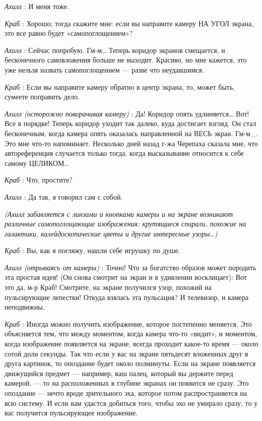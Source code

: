\documentclass[../main.tex]{subfiles}
\begin{document}
\begin{dialogue}
\emph{Ахилл} : И меня тоже.

\emph{Краб} : Хорошо; тогда скажите мне: если вы направите камеру НА УГОЛ экрана, это все равно будет «самопоглощением»?

\emph{Ахилл} : Сейчас попробую. Гм-м\ldots{} Теперь коридор экранов смещается, и бесконечного самовложения больше не выходит. Красиво, но мне кажется, это уже нельзя назвать самопоглощением --- разве что неудавшимся.

\emph{Краб} : Если вы направите камеру обратно в центр экрана, то, может быть, сумеете поправить дело.

\emph{Ахилл (осторожно поворачивая камеру)} : Да! Коридор опять удлиняется\ldots{} Вот! Все в порядке! Теперь коридор уходит так далеко, куда достигает взгляд. Он стал бесконечным, когда камера опять оказалась направленной на ВЕСЬ экран. Гм-м\_. Это мне что-то напоминает. Несколько дней назад г-жа Черепаха сказала мне, что автореференция случается только тогда, когда высказывание относится к себе самому ЦЕЛИКОМ\ldots{}

\emph{Краб} : Что, простите?

\emph{Ахилл} : Да так, я говорил сам с собой.

\emph{(Ахилл забавляется с линзами и кнопками камеры и на экране возникают различные самопоглощающие изображения: крутящиеся спирали, похожие на галактики, калейдоскопические цветы и другие интересные узоры\ldots)}

\emph{Краб} : Вы, как я погляжу, нашли себе игрушку по душе.

\emph{Ахилл (отрываясь от камеры)} : Точно! Что за богатство образов может породить эта простая идея! (Он снова смотрит на экран и в удивлении восклицает): Вот это да, м-р Краб! Смотрите, на экране получился узор, похожий на пульсирующие лепестки! Откуда взялась эта пульсация? И телевизор, и камера неподвижны.

\emph{Краб} : Иногда можно получить изображение, которое постепенно меняется. Это объясняется тем, что между моментом, когда камера что-то «видит», и моментом, когда изображение появляется на экране, всегда проходит какое-то время --- около сотой доли секунды. Так что если у вас на экране пятьдесят вложенных друг в друга картинок, то опоздание будет около полминуты. Если на экране появляется движущийся предмет --- например, ваш палец, который вы держите перед камерой, --- то на расположенных в глубине экранах он появится не сразу. Это опоздание --- нечто вроде зрительного эха, которое потом распространяется на всю систему. И если вам удастся добиться того, чтобы эхо не умирало сразу, то у вас получится пульсирующее изображение.


\end{dialogue}
\end{document}
